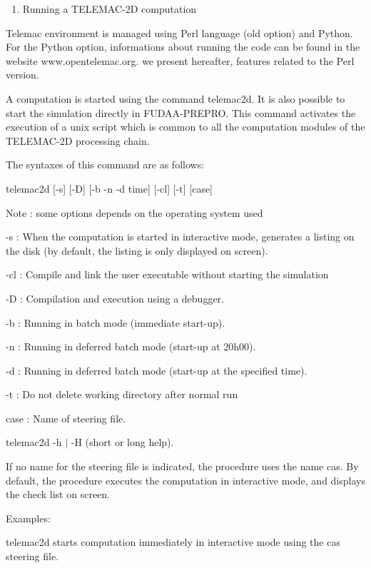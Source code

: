 \documentclass{article} %
\begin{document}
\begin{enumerate}
\item   Running a TELEMAC-2D computation
\end{enumerate}



 Telemac environment is managed using Perl language (old option) and Python. For the Python option, informations about running the code can be found in the website www.opentelemac.org. we present hereafter, features related to the Perl version.

 A computation is started using the command telemac2d. It is also possible to start the simulation directly in FUDAA-PREPRO. This command activates the execution of a unix script which is common to all the computation modules of the TELEMAC-2D processing chain.

 The syntaxes of this command are as follows:

 telemac2d [-s] [-D] [-b {\textbar} -n {\textbar} -d time] [-cl] [-t] [case]

 Note : some options depends on the operating system used



 -s : When the computation is started in interactive mode, generates a listing on the disk (by default, the listing is only displayed on screen).

 -cl : Compile and link the user executable without starting the simulation

 -D : Compilation and execution using a debugger.

 -b : Running in batch mode (immediate start-up).

 -n : Running in deferred batch mode (start-up at 20h00).

 -d : Running in deferred batch mode (start-up at the specified time).

 -t : Do not delete working directory after normal run

 case : Name of steering file.



  telemac2d  -h $\mid$ -H  (short or long help).





 If no name for the steering file is indicated, the procedure uses the name cas. By default, the procedure executes the computation in interactive mode, and displays the check list on screen.

 Examples:

 telemac2d starts computation immediately in interactive mode using the cas steering file.
\end{document}

